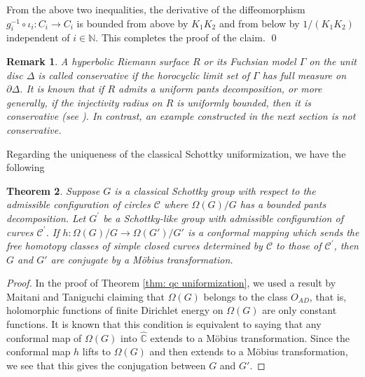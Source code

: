 \documentclass[12pt]{amsart}
\theoremstyle{plain}
\newtheorem{thm}{Theorem}[section]
\newtheorem{rem}[thm]{Remark}
\begin{document}
From the above two inequalities, the derivative of the diffeomorphism $g_i^{-1} \circ \iota_i:C_i \to C_i$ 
is bounded from above by $K_1 K_2$ and from below by $1/(K_1 K_2)$ independent of $i \in \mathbb N$.
This completes the proof of the claim.
\qed
\medskip

\begin{rem}
{\rm A hyperbolic Riemann surface $R$ or its Fuchsian model $\Gamma$ on the unit disc 
$\Delta$ is called {\it conservative} if
the horocyclic limit set of $\Gamma$ has full measure on $\partial \Delta$. It is known that
if $R$ admits a uniform pants decomposition, or more generally, if the injectivity  radius  on $R$ is  uniformly bounded,
then it is conservative (see \cite[Th.5.11]{M-T}). In contrast, 
an example constructed in the next section is not conservative.}
\end{rem}

Regarding the uniqueness of the classical Schottky uniformization,
we have the following

\begin{thm}\label{uniqueness}
Suppose $G$  is a classical Schottky group with respect to the admissible configuration of circles $\mathcal{C}$ where   
 $\Omega(G)/G$ has  a bounded pants decomposition. Let 
 $G^{\prime}$ be a Schottky-like group with admissible configuration of 
 curves $\mathcal{C}^{\prime}$. If 
 $h:\Omega(G)/G \to \Omega(G')/G'$ is a conformal mapping which sends the  free homotopy classes of simple closed curves determined by 
$\mathcal C$  to those of $\mathcal{C}^{\prime}$,  then $G$ and $G'$ are conjugate by a M\"obius transformation.
\end{thm}

\begin{proof}
In the proof of Theorem \ref{thm: qc uniformization}, we used a result by
Maitani and Taniguchi \cite{M-T} claiming that $\Omega(G)$ 
belongs to the class $O_{AD}$, that is, holomorphic functions of finite
Dirichlet energy on $\Omega(G)$ are only constant functions. It is known that
this condition is equivalent to saying that any conformal map of $\Omega(G)$ 
into $\widehat{\mathbb C}$ 
extends to a M\"obius transformation. Since the conformal map $h$ lifts to $\Omega(G)$
and then extends to a M\"obius transformation, we see that this gives the conjugation between
$G$ and $G'$.
\end{proof}
\end{document}
